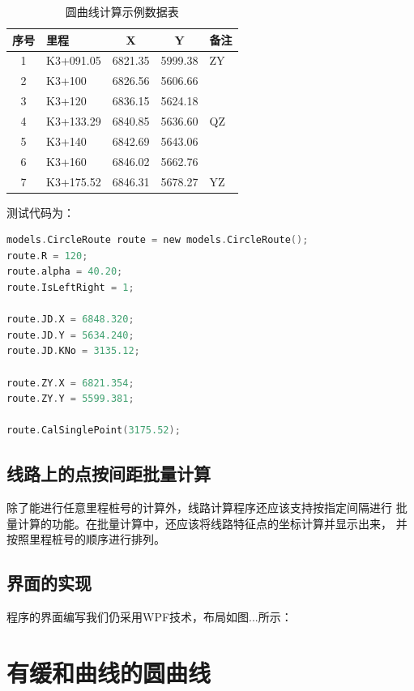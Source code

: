 \begin{table}[htbp]
\centering
\caption{圆曲线计算示例数据表}
\label{tab:YRoute}
\begin{tabular}{clccl}
\hline
序号  &  里程     &     X    &   Y	  & 备注 \\
\hline
1    & K3+091.05 &  6821.35 & 5999.38 &  ZY \\
2    & K3+100	 & 	6826.56 & 5606.66 &     \\
3    & K3+120	 &  6836.15 & 5624.18 &     \\
4    & K3+133.29 &  6840.85 & 5636.60 &  QZ \\
5    & K3+140	 & 	6842.69 & 5643.06 &     \\
6    & K3+160	 &  6846.02 & 5662.76 &     \\
7    & K3+175.52 &  6846.31 & 5678.27 &  YZ \\
\hline
\end{tabular}
\end{table}

测试代码为：
\begin{lstlisting}[language=C]
models.CircleRoute route = new models.CircleRoute();
route.R = 120;
route.alpha = 40.20;
route.IsLeftRight = 1;

route.JD.X = 6848.320;
route.JD.Y = 5634.240;
route.JD.KNo = 3135.12;

route.ZY.X = 6821.354;
route.ZY.Y = 5599.381;

route.CalSinglePoint(3175.52);
\end{lstlisting}

\subsection{线路上的点按间距批量计算}

除了能进行任意里程桩号的计算外，线路计算程序还应该支持按指定间隔进行
批量计算的功能。在批量计算中，还应该将线路特征点的坐标计算并显示出来，
并按照里程桩号的顺序进行排列。


\subsection{界面的实现}

程序的界面编写我们仍采用WPF技术，布局如图...所示：


\section{有缓和曲线的圆曲线}

